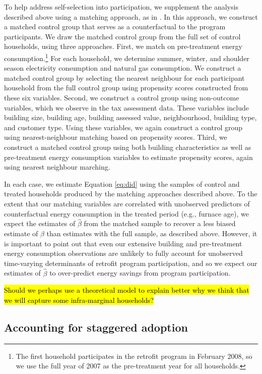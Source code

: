 \documentclass{article}
\newcommand{\hlc}[2][yellow]{ {\sethlcolor{#1} \hl{#2}} }
\begin{document}
To help address self-selection into participation, we supplement the analysis described above using a matching approach, as in \cite{chuang2022residential}. In this approach, we construct a matched control group that serves as a counterfactual to the program participants. We draw the matched control group from the full set of control households, using three approaches.  First, we match on pre-treatment energy consumption.\footnote{The first household participates in the retrofit program in February 2008, so we use the full year of 2007 as the pre-treatment year for all households.} For each household, we determine summer, winter, and shoulder season electricity consumption and natural gas consumption. We construct a matched control group by selecting the nearest neighbour for each participant household from the full control group using propensity scores constructed from these six variables.  Second, we construct a control group using non-outcome variables, which we observe in the tax assessment data.  These variables include building size, building age, building assessed value, neighbourhood, building type, and customer type. Using these variables, we again construct a control group using nearest-neighbour matching based on propensity scores.  Third, we construct a matched control group using both building characteristics as well as pre-treatment energy consumption variables to estimate propensity scores, again using nearest neighbour marching.

In each case, we estimate Equation \eqref{eq:did} using the samples of control and treated households produced by the matching approaches described above. To the extent that our matching variables are correlated with unobserved predictors of counterfactual energy consumption in the treated period (e.g., furnace age), we expect the estimates of $\hat{\beta}$ from the matched sample to recover a less biased estimate of $\beta$ than estimates with the full sample, as described above. However, it is important to point out that even our extensive building and pre-treatment energy consumption observations are unlikely to fully account for unobserved time-varying determinants of retrofit program participation, and so we expect our estimates of $\hat{\beta}$ to over-predict energy savings from program participation.

\hlc{Should we perhaps use a theoretical model to explain better why we think that we will capture some infra-marginal households?}

\subsection{Accounting for staggered adoption}
 
\end{document}
